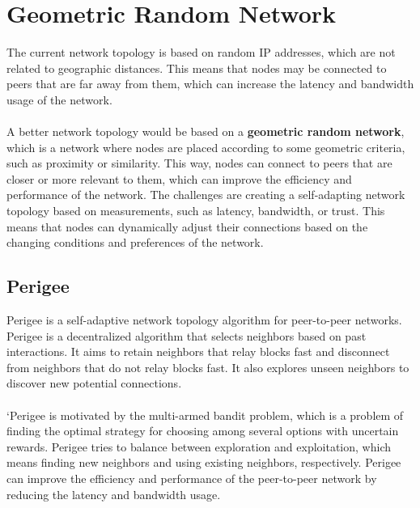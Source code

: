 \documentclass{report}
\begin{document}
\section{Geometric Random Network}
The current network topology is based on random IP addresses, which are not related to geographic distances. This means that nodes may be connected to peers that are far away from them, which can increase the latency and bandwidth usage of the network. \\\\
A better network topology would be based on a \textbf{geometric random network}, which is a network where nodes are placed according to some geometric criteria, such as proximity or similarity. This way, nodes can connect to peers that are closer or more relevant to them, which can improve the efficiency and performance of the network. The challenges are creating a self-adapting network topology based on measurements, such as latency, bandwidth, or trust. This means that nodes can dynamically adjust their connections based on the changing conditions and preferences of the network.

\subsection{Perigee}
Perigee is a self-adaptive network topology algorithm for peer-to-peer networks. Perigee is a decentralized algorithm that selects neighbors based on past interactions. It aims to retain neighbors that relay blocks fast and disconnect from neighbors that do not relay blocks fast. It also explores unseen neighbors to discover new potential connections.\\\\
`Perigee is motivated by the multi-armed bandit problem, which is a problem of finding the optimal strategy for choosing among several options with uncertain rewards. Perigee tries to balance between exploration and exploitation, which means finding new neighbors and using existing neighbors, respectively. Perigee can improve the efficiency and performance of the peer-to-peer network by reducing the latency and bandwidth usage.
\end{document}
